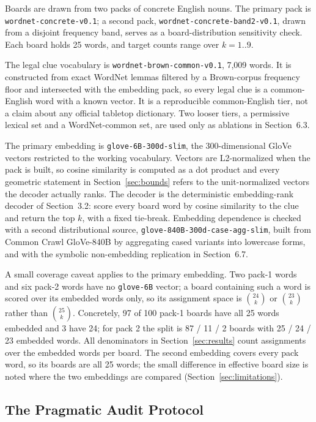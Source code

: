 \documentclass[11pt]{article}
\begin{document}
Boards are drawn from two packs of concrete English nouns. The primary pack is
\texttt{wordnet-concrete-v0.1}; a second pack,
\texttt{wordnet-concrete-band2-v0.1}, drawn from a disjoint frequency band,
serves as a board-distribution sensitivity check. Each board holds 25 words, and
target counts range over $k = 1..9$.

The legal clue vocabulary is \texttt{wordnet-brown-common-v0.1}, 7,009 words. It
is constructed from exact WordNet lemmas filtered by a Brown-corpus frequency
floor and intersected with the embedding pack, so every legal clue is a
common-English word with a known vector. It is a reproducible common-English
tier, not a claim about any official tabletop dictionary. Two looser tiers, a
permissive lexical set and a WordNet-common set, are used only as ablations in
Section~6.3.

The primary embedding is \texttt{glove-6B-300d-slim}, the 300-dimensional GloVe
vectors restricted to the working vocabulary. Vectors are L2-normalized when the
pack is built, so cosine similarity is computed as a dot product and every
geometric statement in Section~\ref{sec:bounds} refers to the unit-normalized
vectors the decoder actually ranks. The decoder is the deterministic
embedding-rank decoder of Section~3.2: score every board word by cosine
similarity to the clue and return the top $k$, with a fixed tie-break. Embedding
dependence is checked with a second distributional source,
\texttt{glove-840B-300d-case-agg-slim}, built from Common Crawl GloVe-840B by
aggregating cased variants into lowercase forms, and with the symbolic
non-embedding replication in Section~6.7.

A small coverage caveat applies to the primary embedding. Two pack-1 words and
six pack-2 words have no \texttt{glove-6B} vector; a board containing such a word
is scored over its embedded words only, so its assignment space is
$\binom{24}{k}$ or $\binom{23}{k}$ rather than $\binom{25}{k}$. Concretely, 97 of
100 pack-1 boards have all 25 words embedded and 3 have 24; for pack 2 the split
is 87 / 11 / 2 boards with 25 / 24 / 23 embedded words. All denominators in
Section~\ref{sec:results} count assignments over the embedded words per board.
The second embedding covers every pack word, so its boards are all 25 words; the
small difference in effective board size is noted where the two embeddings are
compared (Section~\ref{sec:limitations}).

\subsection{The Pragmatic Audit Protocol}
\end{document}
